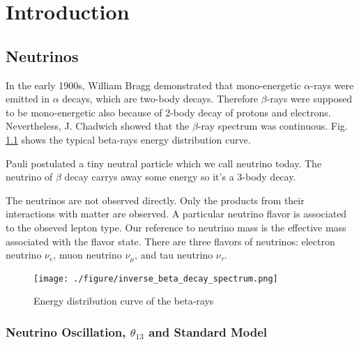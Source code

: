 
\chapter{Introduction}

\section{Neutrinos}

In the early 1900s, William Bragg demonstrated that mono-energetic $\alpha$-rays
were emitted in $\alpha$ decays\cite{Franklin:ch1}, which are two-body decays. Therefore $\beta$-rays
were supposed to be mono-energetic also because of 2-body decay of protons and
electrons. Nevertheless, J. Chadwich showed that the $\beta$-ray
spectrum was continuous\cite{Franklin:ch1}. Fig. \ref{fig:inverse_beta_decay_spectrum.png} shows the typical beta-rays energy distribution curve.


Pauli postulated a tiny neutral particle which we call neutrino today. The neutrino
of $\beta$ decay carrys away some energy so it's a 3-body decay.\cite{Franklin:ch1}






The neutrinos are not observed directly. Only the products from their interactions
with matter are observed. A particular neutrino flavor is associated to the obseved lepton type.
Our reference to neutrino mass is the effective mass
associated with the flavor state.
There are three flavors of neutrinos: electron neutrino $\nu_e$, muon neutrino $\nu_{\mu}$, and
tau neutrino $\nu_{\tau}$.\cite{Franklin:ch1}\cite{pdg}





\begin{figure}
    \centering
    \texttt{[image: ./figure/inverse\_beta\_decay\_spectrum.png]}
    \caption{Energy distribution curve of the beta-rays \cite{Scott:1935}}
    \label{fig:inverse_beta_decay_spectrum.png}
    \end{figure}




\subsection{Neutrino Oscillation, $\theta_{13}$ and Standard Model}



